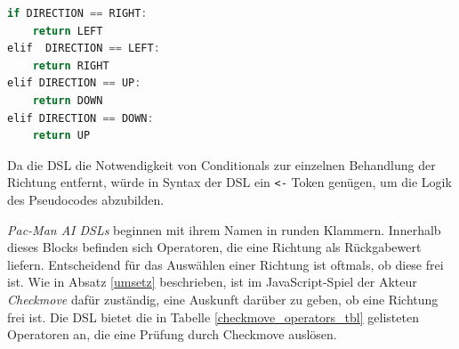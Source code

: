 \documentclass[conference]{IEEEtran}
\begin{document}
\begin{lstlisting}[language=Java, captionpos=b, caption=Umkehren der Richtung in Pseudocode, label=direction_pseudo]
if DIRECTION == RIGHT:
    return LEFT
elif  DIRECTION == LEFT:
    return RIGHT
elif DIRECTION == UP:
    return DOWN
elif DIRECTION == DOWN:
    return UP
\end{lstlisting}

Da die DSL die Notwendigkeit von Conditionals zur einzelnen Behandlung der Richtung entfernt, würde in Syntax der DSL ein \texttt{<-} Token genügen, um  die Logik des Pseudocodes abzubilden.

\emph{Pac-Man AI DSLs} beginnen mit ihrem Namen in runden Klammern. Innerhalb dieses Blocks befinden sich Operatoren, die eine Richtung als Rückgabewert liefern. Entscheidend für das Auswählen einer Richtung ist oftmals, ob diese frei ist. Wie in Absatz \ref{umsetz} beschrieben, ist im JavaScript-Spiel der Akteur \emph{Checkmove} dafür zuständig, eine Auskunft darüber zu geben, ob eine Richtung frei ist. Die DSL bietet die in Tabelle \ref{checkmove_operators_tbl} gelisteten Operatoren an, die eine Prüfung durch Checkmove auslösen.

\lstset{
  breaklines=true
  }
\end{document}
